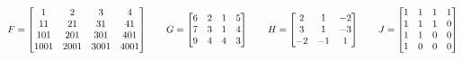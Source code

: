\documentclass[a4paper]{article}
\begin{document}
\begin{problem}[2011-12 resit]
\begin{itemize}
\[    F = \left[\begin{matrix} 1&2&3&4 \\ 11&21&31&41 \\ 101&201&301&401 \\ 1001&2001&3001&4001 \end{matrix}\right] 
    \hspace{2em}
    G = \left[\begin{matrix} 6&2&1&5 \\ 7&3&1&4 \\ 9&4&4&3 \end{matrix}\right] 
    \hspace{2em}
    H = \left[\begin{matrix} 2&1&-2\\ 3&1&-3 \\ -2&-1&1 \end{matrix}\right]
    \hspace{2em}
    J = \left[\begin{matrix} 1&1&1&1 \\ 1&1&1&0 \\ 1&1&0&0 \\ 1&0&0&0 \end{matrix}\right]
   \]
 \end{itemize}
\end{problem}
\end{document}
